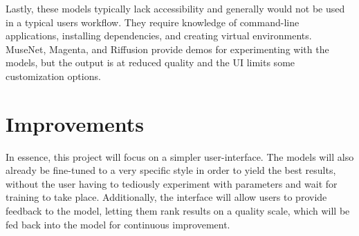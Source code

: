 \documentclass[]{MSword}
\begin{document}
\par{Lastly, these models typically lack accessibility and generally would not be used in a typical users workflow. They require knowledge of command-line applications, installing dependencies, and creating virtual environments. MuseNet\cite{musenetdemo}, Magenta\cite{performancernndemo}, and Riffusion\cite{riffusiondemo} provide demos for experimenting with the models, but the output is at reduced quality and the UI limits some customization options.}

\section{Improvements}

\par{In essence, this project will focus on a simpler user-interface. The models will also already be fine-tuned to a very specific style in order to yield the best results, without the user having to tediously experiment with parameters and wait for training to take place. Additionally, the interface will allow users to provide feedback to the model, letting them rank results on a quality scale, which will be fed back into the model for continuous improvement.}

\printbibliography
\end{document}
